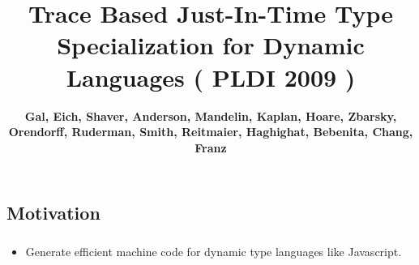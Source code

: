 \documentclass[mathserif,10pt]{beamer}
\title{Trace Based Just-In-Time Type Specialization for Dynamic Languages ( PLDI 2009 )}
\author{{\textbf{Gal, Eich, Shaver, Anderson, Mandelin, Kaplan, Hoare, Zbarsky, Orendorff, Ruderman, Smith, Reitmaier, Haghighat, Bebenita, Chang, Franz}} }
\newcommand{\cmt}[1]{}
\begin{document}
  \begin{frame}
  \titlepage
  \end{frame}

\frame
{
}

\subsection{Motivation}
\frame
{
  \frametitle{\subsecname}
  \begin{itemize}
  \item Generate efficient machine code for dynamic type languages like Javascript. \\
    \begin{itemize}
    \end{itemize}
  \end{itemize}
}
\cmt{Applications written in modern dynamic languages such as Java or .NET are shipped in
the form of high-level intermediate bytecode. This offers two distinct advantages over
shipping programs directly as compiled machine code. On the one hand the bytecode is
architecture independent and can be executed on different target systems using different
native instruction sets and software frameworks (i.e. operating systems). This makes
bytecode programs portable across target platforms.

Without static information about the types of res and v, a JIT
compiler must emit code to handle all possible combinations of
operand types. Moreover, every time values are copied around, the
compiler must emit code to keep track of the types of the involved
values, using either a separate type tag for the value or a specialized
marshaling format. This incurs a large runtime overhead on the
generated code, greatly increases the complexity of the compiler,
and makes effective implementation of important optimizations
like register allocation and loop invariant code motion much harder

      \uncover<3>{ \item Bytecode interpreter becomes slow}
}
\end{document}
